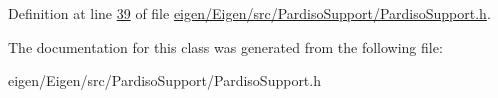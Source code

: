 Definition at line \hyperlink{eigen_2_eigen_2src_2_pardiso_support_2_pardiso_support_8h_source_l00039}{39} of file \hyperlink{eigen_2_eigen_2src_2_pardiso_support_2_pardiso_support_8h_source}{eigen/\+Eigen/src/\+Pardiso\+Support/\+Pardiso\+Support.\+h}.



The documentation for this class was generated from the following file\+:\begin{DoxyCompactItemize}
\item 
eigen/\+Eigen/src/\+Pardiso\+Support/\+Pardiso\+Support.\+h\end{DoxyCompactItemize}
